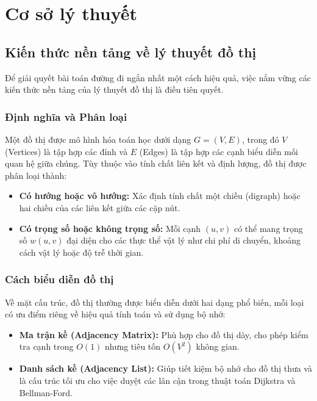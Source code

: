 \documentclass[14pt,a4paper]{report}
\begin{document}
\vspace{50pt}\vspace{50pt}

\section{Cơ sở lý thuyết}

\subsection{Kiến thức nền tảng về lý thuyết đồ thị}
\justifying\fontsize{12pt}{13pt}\selectfont
Để giải quyết bài toán đường đi ngắn nhất một cách hiệu quả, việc nắm vững các kiến thức nền tảng của lý thuyết đồ thị là điều tiên quyết.
\subsubsection{Định nghĩa và Phân loại}
\justifying\fontsize{12pt}{13pt}\selectfont
Một đồ thị được mô hình hóa toán học dưới dạng $G = (V, E)$, trong đó $V$ (Vertices) là tập hợp các đỉnh và $E$ (Edges) là tập hợp các cạnh biểu diễn mối quan hệ giữa chúng. Tùy thuộc vào tính chất liên kết và định lượng, đồ thị được phân loại thành:
\begin{itemize}
    \item \textbf{Có hướng hoặc vô hướng:} Xác định tính chất một chiều (digraph) hoặc hai chiều của các liên kết giữa các cặp nút.
    \item \textbf{Có trọng số hoặc không trọng số:} Mỗi cạnh $(u, v)$ có thể mang trọng số $w(u, v)$ đại diện cho các thực thể vật lý như chi phí di chuyển, khoảng cách vật lý hoặc độ trễ thời gian.
\end{itemize}

\subsubsection{Cách biểu diễn đồ thị}
\justifying\fontsize{12pt}{13pt}\selectfont
Về mặt cấu trúc, đồ thị thường được biểu diễn dưới hai dạng phổ biến, mỗi loại có ưu điểm riêng về hiệu quả tính toán và sử dụng bộ nhớ:
\begin{itemize}
    \item \textbf{Ma trận kề (Adjacency Matrix): }  Phù hợp cho đồ thị dày, cho phép kiểm tra cạnh trong $O(1)$ nhưng tiêu tốn $O(V^2)$ không gian.
    \item \textbf{Danh sách kề (Adjacency List): }  Giúp tiết kiệm bộ nhớ cho đồ thị thưa và là cấu trúc tối ưu cho việc duyệt các lân cận trong thuật toán Dijkstra và Bellman-Ford.
\end{itemize}
\end{document}
